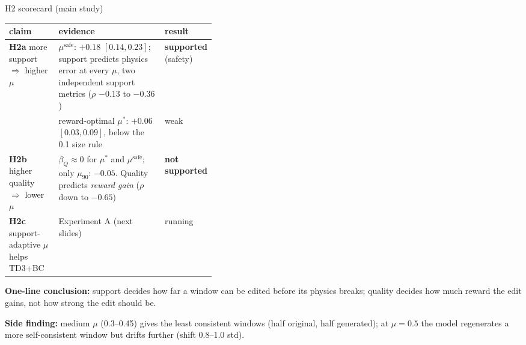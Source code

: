 \documentclass[aspectratio=169,11pt]{beamer}
\newcommand{\hyp}[1]{\textcolor{acc}{\textbf{#1}}}
\newcommand{\yes}{\textcolor{ok}{\textbf{supported}}}
\newcommand{\nope}{\textcolor{no}{\textbf{not supported}}}
\begin{document}
\begin{frame}{H2 scorecard (main study)}
\small
\renewcommand{\arraystretch}{1.2}
\begin{tabularx}{\linewidth}{@{}p{0.24\linewidth}Yp{0.16\linewidth}@{}}
\toprule
claim & evidence & result\\
\midrule
\hyp{H2a} more support $\Rightarrow$ higher $\mu$ & $\mu^{\text{safe}}$: $+0.18$ $[0.14,0.23]$; support predicts physics error at every $\mu$, two independent support metrics ($\rho$ $-0.13$ to $-0.36$) & \yes{} (safety)\\
 & reward-optimal $\mu^*$: $+0.06$ $[0.03,0.09]$, below the 0.1 size rule & weak\\
\hyp{H2b} higher quality $\Rightarrow$ lower $\mu$ & $\beta_Q\approx0$ for $\mu^*$ and $\mu^{\text{safe}}$; only $\mu_{90}$: $-0.05$. Quality predicts \emph{reward gain} ($\rho$ down to $-0.65$) & \nope{}\\
\hyp{H2c} support-adaptive $\mu$ helps TD3+BC & Experiment A (next slides) & running\\
\bottomrule
\end{tabularx}
\vspace{0.4em}

\textbf{One-line conclusion:} support decides how far a window can be edited before its physics breaks; quality decides how much reward the edit gains, not how strong the edit should be.
\vspace{0.3em}

\small\textbf{Side finding:} medium $\mu$ (0.3--0.45) gives the least consistent windows (half original, half generated); at $\mu=0.5$ the model regenerates a more self-consistent window but drifts further (shift 0.8--1.0 std).
\end{frame}

\end{document}
